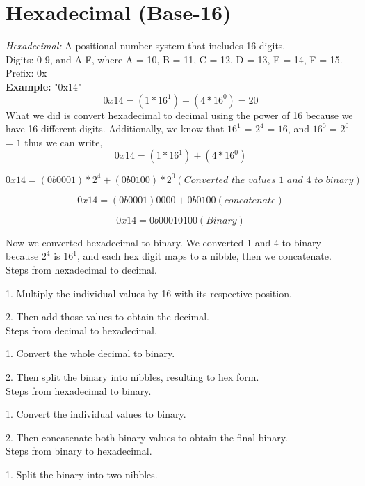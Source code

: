 \documentclass{article}
\begin{document}
\section{Hexadecimal (Base-16)}
\textit{Hexadecimal:} A positional number system that includes 16 digits. \\

\noindent Digits: 0-9, and A-F, where A = 10, B = 11, C = 12, D = 13, E = 14, F = 15. \\

\noindent Prefix: 0x \\

\textbf{Example:} "0x14"
\[
0x14 = (1 * 16^1) + (4 * 16^0) = 20
\]
What we did is convert hexadecimal to decimal using the power of 16 because we have 16 different digits. 
Additionally, we know that $16^1$ = $2^4$ = $16$, and $16^0$ = $2^0$ = $1$ thus we can write,
\[
0x14 = (1 * 16^1) + (4 * 16^0)
\]

\[
0x14 = (0b0001) * 2^4 + (0b0100) * 2^0 (\textit{Converted the values 1 and 4 to binary})
\]

\[
0x14 = (0b0001) 0000 + 0b0100  (\textit{concatenate})
\]

\[
    0x14 = 0b0001 0100 (\textit{Binary})
\]

Now we converted hexadecimal to binary. We converted 1 and 4 to binary because $2^4$ is $16^1$, and 
each hex digit maps to a nibble, then we concatenate. \\

\noindent Steps from hexadecimal to decimal.

1. Multiply the individual values by 16 with its respective position.

2. Then add those values to obtain the decimal. \\

\noindent Steps from decimal to hexadecimal.

1. Convert the whole decimal to binary.

2. Then split the binary into nibbles, resulting to hex form. \\

\noindent Steps from hexadecimal to binary. 

1. Convert the individual values to binary.

2. Then concatenate both binary values to obtain the final binary. \\

\noindent Steps from binary to hexadecimal. 

1. Split the binary into two nibbles.
\end{document}
